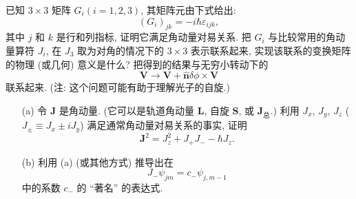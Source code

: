 \documentclass{assignment}
\begin{document}
\begin{prob}[课本习题 3.14]
    已知 $3\times 3$ 矩阵 $G_i(i=1,2,3)$, 其矩阵元由下式给出:
    \[
        (G_i)_{jk}=-i\hbar\varepsilon_{ijk},
    \]
    其中 $j$ 和 $k$ 是行和列指标, 证明它满足角动量对易关系. 把 $G_i$ 与比较常用的角动量算符 $J_i$, 在 $J_3$ 取为对角的情况下的 $3\times 3$ 表示联系起来, 实现该联系的变换矩阵的物理 (或几何) 意义是什么? 把得到的结果与无穷小转动下的
    \[
        \bm{V}\rightarrow\bm{V}+\hat{\bm{n}}\delta\phi\times\bm{V}
    \]
    联系起来. (注: 这个问题可能有助于理解光子的自旋.)
\end{prob}
\begin{pf}
    
\end{pf}

\begin{prob}[课本习题 3.15]
    \begin{itemize}
        \item[(a)] 令 $\bm{J}$ 是角动量. (它可以是轨道角动量 $\bm{L}$, 自旋 $\bm{S}$, 或 $\bm{J}_{\text{总}}$.) 利用 $J_x$, $J_y$, $J_z$ ($J_{\pm}\equiv J_x\pm iJ_y$) 满足通常角动量对易关系的事实, 证明
        \[
            \bm{J}^2=J_z^2+J_+J_--\hbar J_z.
        \]
        \item[(b)] 利用 (a) (或其他方式) 推导出在
        \[
            J_-\psi_{jm}=c_-\psi_{j,m-1}
        \]
        中的系数 $c_-$ 的 ``著名'' 的表达式.
    \end{itemize}
\end{prob}
\begin{pf}
    
\end{pf}
\end{document}
